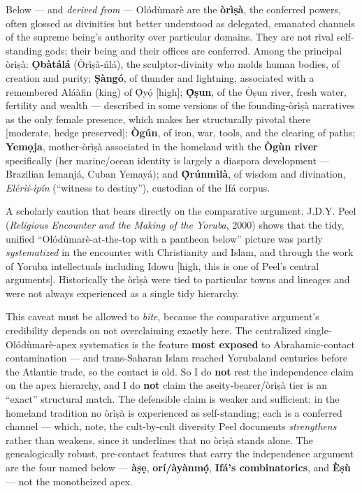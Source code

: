 \documentclass[11pt]{article}
\begin{document}
Below — and \emph{derived from} — Olódùmarè are the \textbf{òrìṣà}, the conferred powers, often glossed as divinities but better understood as delegated, emanated channels of the supreme being's authority over particular domains. They are not rival self-standing gods; their being and their offices are conferred. Among the principal òrìṣà: \textbf{Ọbàtálá} (Òrìṣà-ńlá), the sculptor-divinity who molds human bodies, of creation and purity; \textbf{Ṣàngó}, of thunder and lightning, associated with a remembered Aláàfin (king) of Ọ̀yọ́ [high]; \textbf{Ọ̀ṣun}, of the Òṣun river, fresh water, fertility and wealth — described in some versions of the founding-òrìṣà narratives as the only female presence, which makes her structurally pivotal there [moderate, hedge preserved]; \textbf{Ògún}, of iron, war, tools, and the clearing of paths; \textbf{Yemọja}, mother-òrìṣà associated in the homeland with the \textbf{Ògùn river} specifically (her marine/\allowbreak{}ocean identity is largely a diaspora development — Brazilian Iemanjá, Cuban Yemayá); and \textbf{Ọ̀rúnmìlà}, of wisdom and divination, \emph{Elérìí-ìpín} (``witness to destiny''), custodian of the Ifá corpus.

A scholarly caution that bears directly on the comparative argument. J.D.Y. Peel (\emph{Religious Encounter and the Making of the Yoruba}, 2000) shows that the tidy, unified ``Olódùmarè-at-the-top with a pantheon below'' picture was partly \emph{systematized} in the encounter with Christianity and Islam, and through the work of Yoruba intellectuals including Idowu [high, this is one of Peel's central arguments]. Historically the òrìṣà were tied to particular towns and lineages and were not always experienced as a single tidy hierarchy.

This caveat must be allowed to \emph{bite}, because the comparative argument's credibility depends on not overclaiming exactly here. The centralized single-Olódùmarè-apex systematics is the feature \textbf{most exposed} to Abrahamic-contact contamination — and trans-Saharan Islam reached Yorubaland centuries before the Atlantic trade, so the contact is old. So I do \textbf{not} rest the independence claim on the apex hierarchy, and I do \textbf{not} claim the aseity-bearer/\allowbreak{}òrìṣà tier is an ``exact'' structural match. The defensible claim is weaker and sufficient: in the homeland tradition no òrìṣà is experienced as self-standing; each is a conferred channel — which, note, the cult-by-cult diversity Peel documents \emph{strengthens} rather than weakens, since it underlines that no òrìṣà stands alone. The genealogically robust, pre-contact features that carry the independence argument are the four named below — \textbf{àṣẹ}, \textbf{orí/\allowbreak{}àyànmọ́}, \textbf{Ifá's combinatorics}, and \textbf{Èṣù} — not the monotheized apex.
\end{document}
